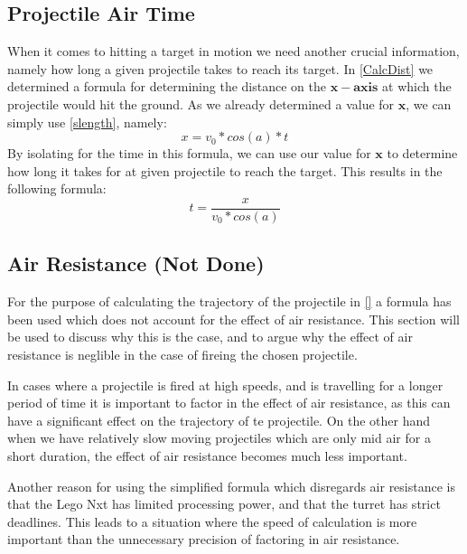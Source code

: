 \subsection{Projectile Air Time}
When it comes to hitting a target in motion we need another crucial information,
namely how long a given projectile takes to reach its target.
In \autoref{CalcDist} we determined a formula for determining the distance on
the $\mathbf{x-axis}$ at which the projectile would hit the ground. As we
already determined a value for $\mathbf{x}$, we can simply use
\autoref{slength}, namely:
\begin{equation}
x=v_0*cos(a)*t
\end{equation}
By isolating for the time in this formula, we can use our value for $\mathbf{x}$
to determine how long it takes for at given projectile to reach the target. This
results in the following formula:
\begin{equation}\label{TimeEq}
t=\frac{x}{v_0*cos(a)}
\end{equation}

\subsection{Air Resistance (Not Done)}\label{AirResDisc}
For the purpose of calculating the trajectory of the projectile in \autoref{} a
formula has been used which does not account for the effect of air resistance.
This section will be used to discuss why this is the case, and to argue why the
effect of air resistance is neglible in the case of fireing the chosen
projectile.\nl

In cases where a projectile is fired at high speeds, and is travelling for a
longer period of time it is important to factor in the effect of air resistance,
as this can have a significant effect on the trajectory of te projectile. On the
other hand when we have relatively slow moving projectiles which are only mid
air for a short duration, the effect of air resistance becomes much less
important.\nl

Another reason for using the simplified formula which disregards air resistance
is that the Lego Nxt has limited processing power, and that the turret has
strict deadlines. This leads to a situation where the speed of calculation is
more important than the unnecessary precision of factoring in air resistance.



